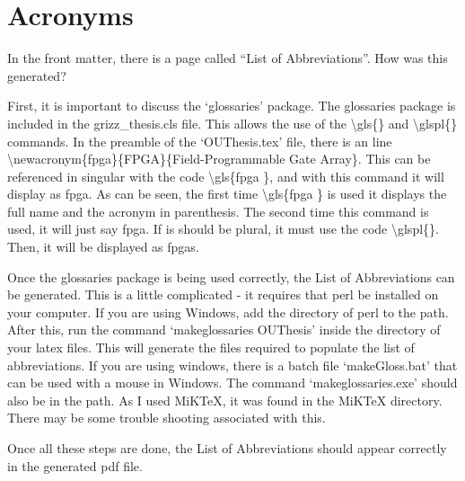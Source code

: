 \section{Acronyms\label{AcronymSetion}}

In the front matter, there is a page called ``List of Abbreviations''. 
How was this generated? 

First, it is important to discuss the `glossaries' package.
The glossaries package is included in the grizz\_thesis.cls file. 
This allows the use of the \textbackslash gls\{\} and \textbackslash glspl\{\} commands. 
In the preamble of the `OUThesis.tex' file, there is an line \textbackslash newacronym\{fpga\}\{FPGA\}\{Field-Programmable Gate Array\}. 
This can be referenced in singular with the code \textbackslash gls\{fpga \}, and with this command it will display as \gls{fpga}. 
As can be seen, the first time \textbackslash gls\{fpga \} is used it displays the full name and the acronym in parenthesis. 
The second time this command is used, it will just say \gls{fpga}.
If is should be plural, it must use the code \textbackslash glspl\{\}. 
Then, it will be displayed as \glspl{fpga}.

Once the glossaries package is being used correctly, the List of Abbreviations can be generated. 
This is a little complicated - it requires that perl be installed on your computer. 
If you are using Windows, add the directory of perl to the path. 
After this, run the command `makeglossaries OUThesis' inside the directory of your latex files. 
This will generate the files required to populate the list of abbreviations.
If you are using windows, there is a batch file `makeGloss.bat' that can be used with a mouse in Windows.
The command `makeglossaries.exe' should also be in the path. 
As I used MiKTeX, it was found in the MiKTeX directory.
There may be some trouble shooting associated with this. 

Once all these steps are done, the List of Abbreviations should appear correctly in the generated pdf file.

